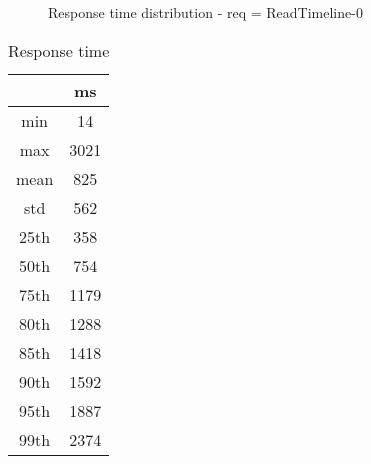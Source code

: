 \begin{minipage}{0.75\linewidth}
\begin{figure}[h]
\begin{adjustbox}{max width=1.0\linewidth, keepaspectratio}
  \end{adjustbox}
  \caption{Response time distribution - req = ReadTimeline-0}
\end{figure}
\end{minipage}\hfill\begin{minipage}{0.18\linewidth}
\begin{table}[h]
\begin{tabular}{|cc|}
\hline
\textbf{} & \textbf{ms}\\ \hline
 \Xhline{0.005\arrayrulewidth}
min & 14\\
 \Xhline{0.005\arrayrulewidth}
max & 3021\\
 \Xhline{0.005\arrayrulewidth}
mean & 825\\
 \Xhline{0.005\arrayrulewidth}
std & 562\\
\hline
\hline
 \Xhline{0.005\arrayrulewidth}
25th & 358\\
 \Xhline{0.005\arrayrulewidth}
50th & 754\\
 \Xhline{0.005\arrayrulewidth}
75th & 1179\\
 \Xhline{0.005\arrayrulewidth}
80th & 1288\\
 \Xhline{0.005\arrayrulewidth}
85th & 1418\\
 \Xhline{0.005\arrayrulewidth}
90th & 1592\\
 \Xhline{0.005\arrayrulewidth}
95th & 1887\\
 \Xhline{0.005\arrayrulewidth}
99th & 2374\\
\hline
\end{tabular}
\caption{Response time}
\end{table}
\end{minipage}\hfill
